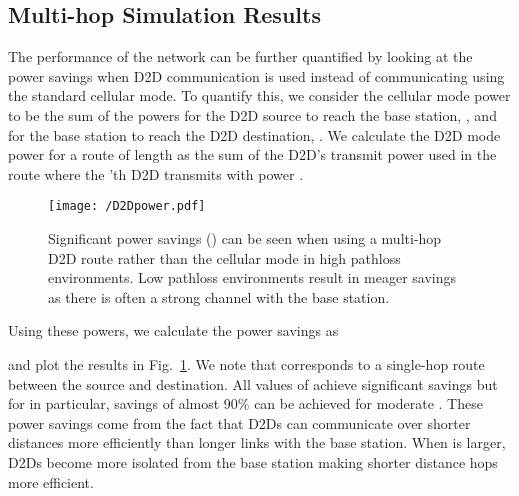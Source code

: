 \documentclass[10pt, final, journal, letterpaper,oneside, twocolumn]{IEEEtran}
\begin{document}
\subsection{Multi-hop Simulation Results}
\label{sec:multihop_simulation}

The performance of the network can be further quantified by looking at the power savings when D2D communication is used instead of communicating using the standard cellular mode.  To quantify this, we consider the cellular mode power to be the sum of the powers for the D2D source to reach the base station, , and for the base station to reach the D2D destination, .  We calculate the D2D mode power for a route of length  as the sum of the D2D's transmit power used in the route where the 'th D2D transmits with power .  
\begin{figure}[htp]
\center
  \texttt{[image: /D2Dpower.pdf]}
  \caption[]{Significant power savings () can be seen when using a multi-hop D2D route rather than the cellular mode in high pathloss environments.  Low pathloss environments result in meager savings as there is often a strong channel with the base station.} 
  \label{fig:d2dpower}
\end{figure}   
Using these powers, we calculate the power savings as

and plot the results in Fig.~\ref{fig:d2dpower}.  We note that  corresponds to a single-hop route between the source and destination.  All values of  achieve significant savings but for  in particular, savings of almost 90\% can be achieved for moderate .  These power savings come from the fact that D2Ds can communicate over shorter distances more efficiently than longer links with the base station.  When  is larger, D2Ds become more isolated from the base station making shorter distance hops more efficient.  
\end{document}
